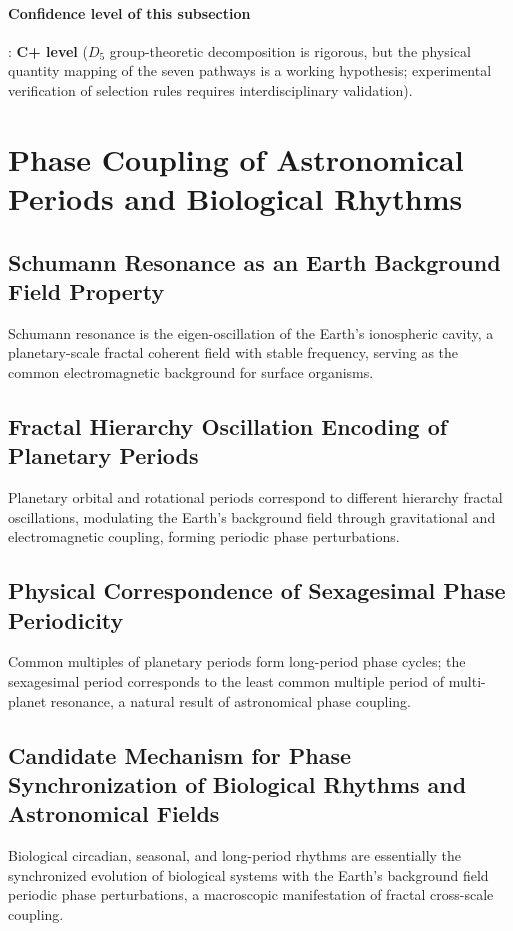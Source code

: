 \documentclass[12pt,a4paper,twocolumn]{article}
\begin{document}
\paragraph{Confidence level of this subsection}: \textbf{C+ level} ($D_5$ group-theoretic decomposition is rigorous, but the physical quantity mapping of the seven pathways is a working hypothesis; experimental verification of selection rules requires interdisciplinary validation).

\section{Phase Coupling of Astronomical Periods and Biological Rhythms}

\subsection{Schumann Resonance as an Earth Background Field Property}
Schumann resonance is the eigen-oscillation of the Earth's ionospheric cavity, a planetary-scale fractal coherent field with stable frequency, serving as the common electromagnetic background for surface organisms.

\subsection{Fractal Hierarchy Oscillation Encoding of Planetary Periods}
Planetary orbital and rotational periods correspond to different hierarchy fractal oscillations, modulating the Earth's background field through gravitational and electromagnetic coupling, forming periodic phase perturbations.

\subsection{Physical Correspondence of Sexagesimal Phase Periodicity}
Common multiples of planetary periods form long-period phase cycles; the sexagesimal period corresponds to the least common multiple period of multi-planet resonance, a natural result of astronomical phase coupling.

\subsection{Candidate Mechanism for Phase Synchronization of Biological Rhythms and Astronomical Fields}
Biological circadian, seasonal, and long-period rhythms are essentially the synchronized evolution of biological systems with the Earth's background field periodic phase perturbations, a macroscopic manifestation of fractal cross-scale coupling.
\end{document}
